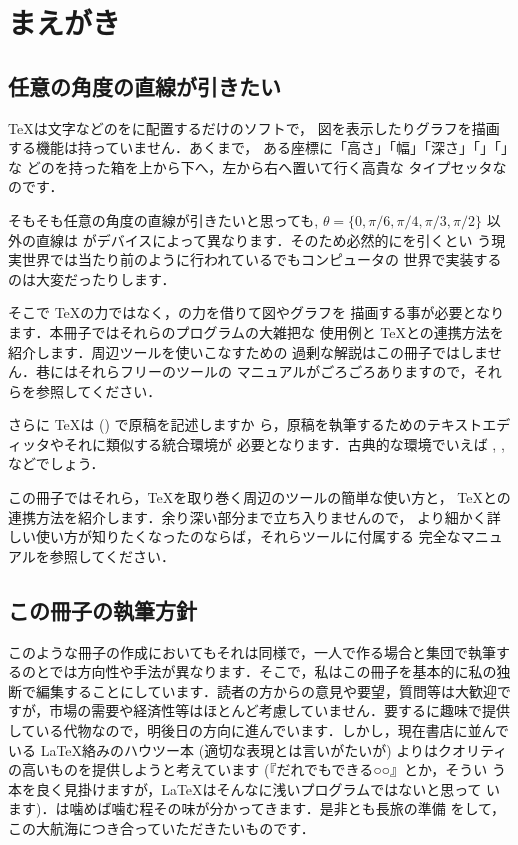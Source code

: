 ﻿\chapter{まえがき}

\section*{任意の角度の直線が引きたい}

\TeX は文字などのをに配置するだけのソフトで，
図を表示したりグラフを描画する機能は持っていません．あくまで，
ある座標に「高さ」「幅」「深さ」「」「」な
どのを持った箱を上から下へ，左から右へ置いて行く高貴な
タイプセッタなのです．

そもそも任意の角度の直線が引きたいと思っても, 
$\theta = \{0,\pi/6,\pi/4,\pi/3,\pi/2\}$ 以外の直線は
がデバイスによって異なります．そのため必然的にを引くとい
う現実世界では当たり前のように行われているでもコンピュータの
世界で実装するのは大変だったりします．

そこで \TeX の力ではなく，の力を借りて図やグラフを
描画する事が必要となります．本冊子ではそれらのプログラムの大雑把な
使用例と \TeX との連携方法を紹介します．周辺ツールを使いこなすための
過剰な解説はこの冊子ではしません．巷にはそれらフリーのツールの
マニュアルがごろごろありますので，それらを参照してください．

さらに \TeX は () で原稿を記述しますか
ら，原稿を執筆するためのテキストエディッタやそれに類似する統合環境が
必要となります．古典的な環境でいえば , ,
 などでしょう．

この冊子ではそれら，\TeX を取り巻く周辺のツールの簡単な使い方と，
\TeX との連携方法を紹介します．余り深い部分まで立ち入りませんので，
より細かく詳しい使い方が知りたくなったのならば，それらツールに付属する
完全なマニュアルを参照してください．

\section*{この冊子の執筆方針}

このような冊子の作成においてもそれは同様で，一人で作る場合と集団で執筆す
るのとでは方向性や手法が異なります．そこで，私はこの冊子を基本的に私の独
断で編集することにしています．読者の方からの意見や要望，質問等は大歓迎で
すが，市場の需要や経済性等はほとんど考慮していません．要するに趣味で提供
している代物なので，明後日の方向に進んでいます．しかし，現在書店に並んで
いる \LaTeX 絡みのハウツー本 (適切な表現とは言いがたいが) よりはクオリティ
の高いものを提供しようと考えています (『だれでもできる○○』とか，そうい
う本を良く見掛けますが，\LaTeX はそんなに浅いプログラムではないと思って
います)．\laTEX は噛めば噛む程その味が分かってきます．是非とも長旅の準備
をして，この大航海につき合っていただきたいものです．

